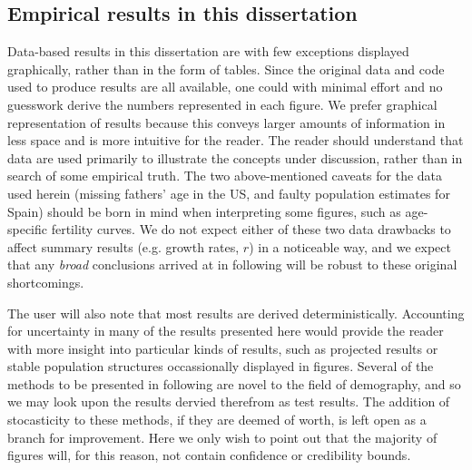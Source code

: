 \subsection{Empirical results in this dissertation}

Data-based results in this dissertation are with few exceptions displayed
graphically, rather than in the form of tables. Since the original data and
code used to produce results are all available, one could with minimal effort
and no guesswork derive the numbers represented in each figure. We prefer
graphical representation of results because this conveys larger amounts of
information in less space and is more intuitive for the reader. The reader
should understand that data are used primarily to illustrate the concepts under discussion, rather
than in search of some empirical truth. The two
above-mentioned caveats for the data used herein (missing fathers' age in the
US, and faulty population estimates for Spain) should be born in mind when
interpreting some figures, such as age-specific fertility curves. We do not
expect either of these two data drawbacks to affect summary results 
(e.g. growth rates, $r$) in a noticeable way, and we expect that any
\textit{broad} conclusions arrived at in following will be robust to these
original shortcomings. 

The user will also note that most results are derived deterministically.
Accounting for uncertainty in many of the results presented here would provide
the reader with more insight into particular kinds of results, such as projected
results or stable population structures occassionally displayed in figures.
Several of the methods to be presented in following are novel to the field of
demography, and so we may look upon the results dervied therefrom as test
results. The addition of stocasticity to these methods, if they are deemed of
worth, is left open as a branch for improvement. Here we only wish to point out
that the majority of figures will, for this reason, not contain confidence or
credibility bounds.

